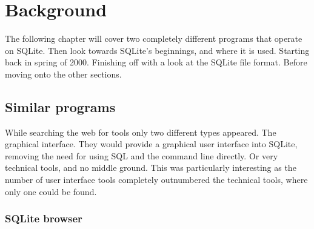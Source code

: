 %
%
%
%
%
%

\section{Background}
\label{sec:sqlite_intro}

The following chapter will cover two completely different programs that operate on SQLite. Then look towards SQLite's beginnings, and where it is used. Starting back in spring of 2000. Finishing off with a look at the SQLite file format. Before moving onto the other sections.

\subsection{Similar programs}
\label{subsec:similar_programs}

While searching the web for tools only two different types appeared. The graphical interface. They would provide a graphical user interface into SQLite, removing the need for using SQL and the command line directly. Or very technical tools, and no middle ground. This was particularly interesting as the number of user interface tools completely outnumbered the technical tools, where only one could be found.

\subsubsection{SQLite browser}
\label{subsubsec:sqlite_browser}

